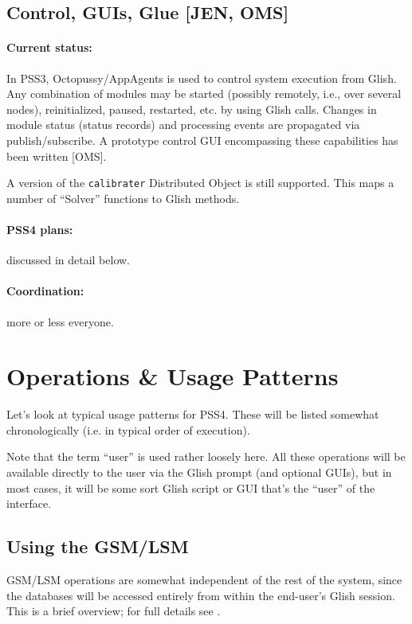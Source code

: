 \documentclass[12pt]{article}
\begin{document}
\subsection{Control, GUIs, Glue [JEN, OMS]}

  \paragraph{Current status:} In PSS3, Octopussy/AppAgents is used to
  control system execution from Glish. Any combination of modules may be
  started (possibly remotely, i.e., over several nodes), reinitialized, paused,
  restarted, etc. by using Glish calls. Changes in module status (status
  records) and processing events are propagated via publish/subscribe. A
  prototype control GUI encompassing these capabilities has been written [OMS].

  A version of the {\tt calibrater} Distributed Object is still supported. This
  maps a number of ``Solver'' functions to Glish methods.

  \paragraph{PSS4 plans:} discussed in detail below.

  \paragraph{Coordination:} more or less everyone.
  
\section{Operations \& Usage Patterns}

  Let's look at typical usage patterns for PSS4. These will be listed somewhat 
  chronologically (i.e. in typical order of execution).

  Note that the term ``user'' is used rather loosely here. All these operations
  will be available directly to the user via the Glish prompt (and optional
  GUIs), but in most cases, it will be some sort Glish script or GUI that's the
  ``user'' of the interface.

\subsection{Using the GSM/LSM}

  GSM/LSM operations are somewhat independent of the rest of the system, since
  the databases will be accessed entirely from within the end-user's Glish
  session. This is a brief overview; for full details see \cite{GSM}.
\end{document}
